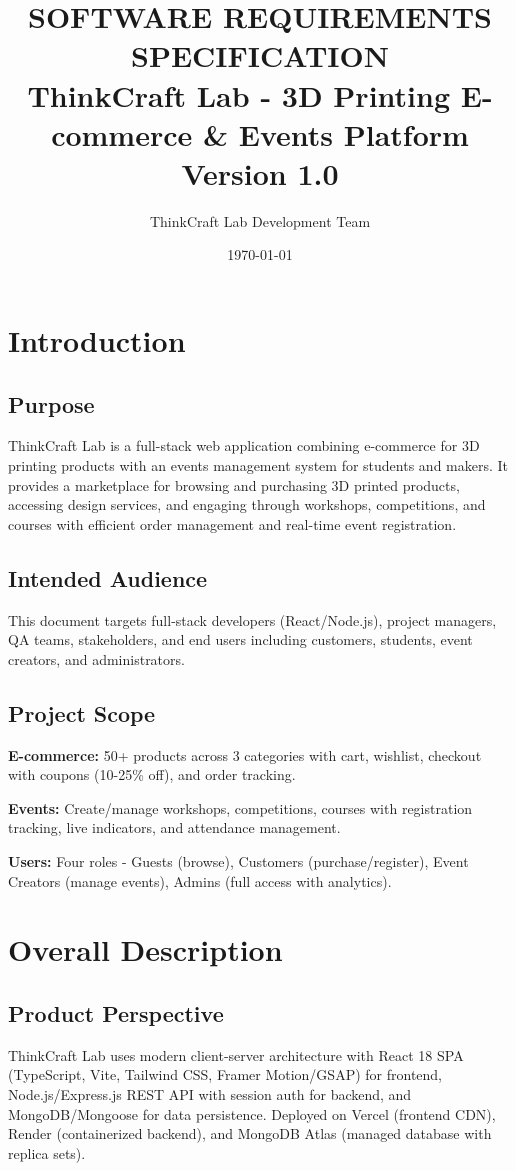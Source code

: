 ﻿\documentclass[11pt]{article}
\title{\textbf{\Large SOFTWARE REQUIREMENTS SPECIFICATION\\[0.2cm]
\large ThinkCraft Lab - 3D Printing E-commerce \& Events Platform\\[0.15cm] Version 1.0}}
\author{ThinkCraft Lab Development Team}
\date{\today}
\begin{document}
\maketitle
\tableofcontents
\newpage

\section{Introduction}

\subsection{Purpose}
ThinkCraft Lab is a full-stack web application combining e-commerce for 3D printing products with an events management system for students and makers. It provides a marketplace for browsing and purchasing 3D printed products, accessing design services, and engaging through workshops, competitions, and courses with efficient order management and real-time event registration.

\subsection{Intended Audience}
This document targets full-stack developers (React/Node.js), project managers, QA teams, stakeholders, and end users including customers, students, event creators, and administrators.

\subsection{Project Scope}
\textbf{E-commerce:} 50+ products across 3 categories with cart, wishlist, checkout with coupons (10-25\% off), and order tracking.

\textbf{Events:} Create/manage workshops, competitions, courses with registration tracking, live indicators, and attendance management.

\textbf{Users:} Four roles - Guests (browse), Customers (purchase/register), Event Creators (manage events), Admins (full access with analytics).

\section{Overall Description}

\subsection{Product Perspective}
ThinkCraft Lab uses modern client-server architecture with React 18 SPA (TypeScript, Vite, Tailwind CSS, Framer Motion/GSAP) for frontend, Node.js/Express.js REST API with session auth for backend, and MongoDB/Mongoose for data persistence. Deployed on Vercel (frontend CDN), Render (containerized backend), and MongoDB Atlas (managed database with replica sets).
\end{document}
